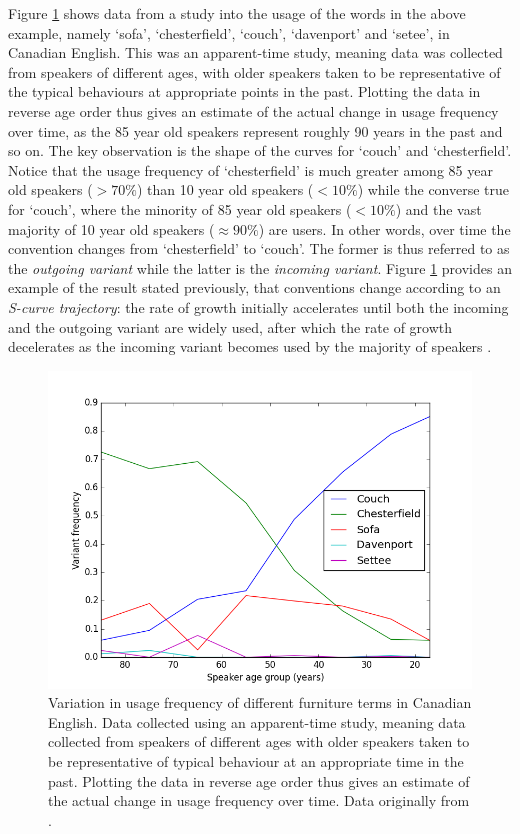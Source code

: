 \documentclass[12pt]{article}
\begin{document}
Figure \ref{sofa} shows data from a study into the usage of the words in the above example, namely `sofa', `chesterfield', `couch', `davenport' and `setee', in Canadian English. This was an apparent-time study, meaning data was collected from speakers of different ages, with older speakers taken to be representative of the typical behaviours at appropriate points in the past. Plotting the data in reverse age order thus gives an estimate of the actual change in usage frequency over time, as the 85 year old speakers represent roughly 90 years in the past and so on. 
The key observation is the shape of the curves for `couch' and `chesterfield'. Notice that the usage frequency of `chesterfield' is much greater among 85 year old speakers ($>70\%$) than 10 year old speakers ($<10\% $) while the converse true for `couch', where the minority of 85 year old speakers ($<10\% $) and the vast majority of 10 year old speakers ($\approx 90\%$) are users. In other words, over time the convention changes from `chesterfield' to `couch'. The former is thus referred to as the \emph{outgoing variant} while the latter is the \emph{incoming variant}. Figure \ref{sofa} provides an example of the result stated previously, that conventions change according to an \emph{S-curve trajectory}: the rate of growth initially accelerates until both the incoming and the outgoing variant are widely used, after which the rate of growth decelerates as the incoming variant becomes used by the majority of speakers \cite{Scurve}.\\
\begin{figure}[h!]
\begin{center}
\includegraphics[width=\textwidth]{Scurves.png}
\end{center}
\caption{Variation in usage frequency of different furniture terms in Canadian English. Data collected using an apparent-time study, meaning data collected from speakers of different ages with older speakers taken to be representative of typical behaviour at an appropriate time in the past. Plotting the data in reverse age order thus gives an estimate of the actual change in usage frequency over time. Data originally from \cite{20}.}\label{sofa}
\end{figure}\\
\end{document}
